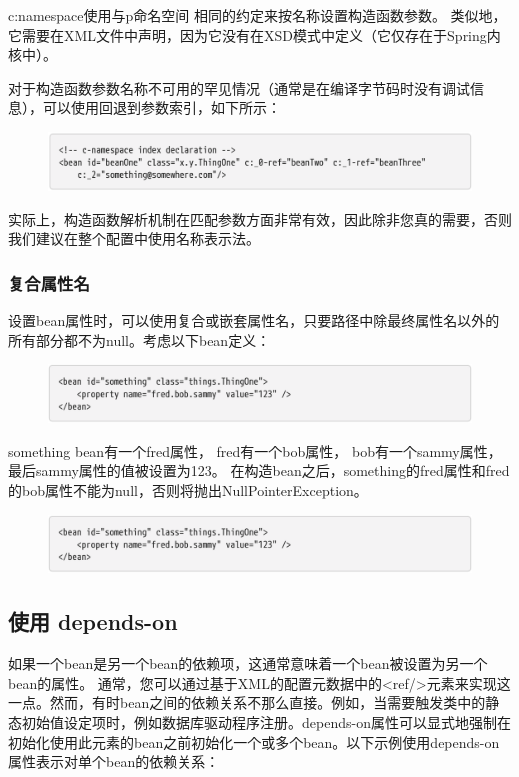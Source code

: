 c:namespace使用与p命名空间
相同的约定来按名称设置构造函数参数。
类似地，它需要在XML文件中声明，因为它没有在XSD模式中定义（它仅存在于Spring内核中）。


对于构造函数参数名称不可用的罕见情况（通常是在编译字节码时没有调试信息），可以使用回退到参数索引，如下所示：

\begin{figure}[ht]
    \centering
    \includegraphics[width=1\linewidth]{./Figure/IMG_code_53.png}
\end{figure}

实际上，构造函数解析机制在匹配参数方面非常有效，因此除非您真的需要，否则我们建议在整个配置中使用名称表示法。

\subsubsection{复合属性名}
设置bean属性时，可以使用复合或嵌套属性名，只要路径中除最终属性名以外的所有部分都不为null。考虑以下bean定义：

\begin{figure}[ht]
    \centering
    \includegraphics[width=1\linewidth]{./Figure/IMG_code_54.png}
\end{figure}

something bean有一个fred属性，
fred有一个bob属性，
bob有一个sammy属性，最后sammy属性的值被设置为123。
在构造bean之后，something的fred属性和fred的bob属性不能为null，否则将抛出NullPointerException。

\begin{figure}[ht]
    \centering
    \includegraphics[width=1\linewidth]{./Figure/IMG_code_54.png}
\end{figure}

\subsection{使用 depends-on}
如果一个bean是另一个bean的依赖项，这通常意味着一个bean被设置为另一个bean的属性。
通常，您可以通过基于XML的配置元数据中的<ref/>元素来实现这一点。然而，有时bean之间的依赖关系不那么直接。例如，当需要触发类中的静态初始值设定项时，例如数据库驱动程序注册。depends-on属性可以显式地强制在初始化使用此元素的bean之前初始化一个或多个bean。以下示例使用depends-on属性表示对单个bean的依赖关系：

